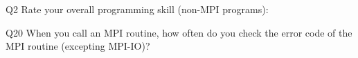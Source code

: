 \begin{description}%
\item{Q2} Rate your overall programming skill (non-MPI programs):%
\item{Q20} When you call an MPI routine, how often do you check the error code of the MPI routine  (excepting MPI-IO)?%
\end{description}%
